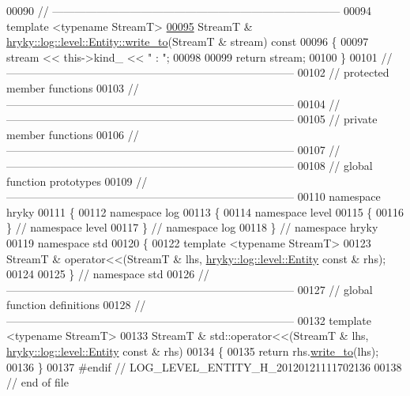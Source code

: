 \begin{DoxyCode}
00090 \textcolor{comment}{//
      ------------------------------------------------------------------------------}
00094 \textcolor{comment}{}\textcolor{keyword}{template} <\textcolor{keyword}{typename} StreamT>
\hypertarget{log__level__entity_8h_source_l00095}{}\hyperlink{classhryky_1_1log_1_1level_1_1_entity_aec2195adf72a8ac59a3bc065e1a6f1e9}{00095} StreamT & \hyperlink{classhryky_1_1log_1_1level_1_1_entity_aec2195adf72a8ac59a3bc065e1a6f1e9}{hryky::log::level::Entity::write_to}(StreamT & stream)\textcolor{keyword}{ const}
00096 \textcolor{keyword}{}\{
00097     stream << this->kind\_ << \textcolor{stringliteral}{" : "};
00098     
00099     \textcolor{keywordflow}{return} stream;
00100 \}
00101 \textcolor{comment}{//
      ------------------------------------------------------------------------------}
00102 \textcolor{comment}{// protected member functions}
00103 \textcolor{comment}{//
      ------------------------------------------------------------------------------}
00104 \textcolor{comment}{//
      ------------------------------------------------------------------------------}
00105 \textcolor{comment}{// private member functions}
00106 \textcolor{comment}{//
      ------------------------------------------------------------------------------}
00107 \textcolor{comment}{//
      ------------------------------------------------------------------------------}
00108 \textcolor{comment}{// global function prototypes}
00109 \textcolor{comment}{//
      ------------------------------------------------------------------------------}
00110 \textcolor{keyword}{namespace }hryky
00111 \{
00112 \textcolor{keyword}{namespace }log
00113 \{
00114 \textcolor{keyword}{namespace }level
00115 \{
00116 \} \textcolor{comment}{// namespace level}
00117 \} \textcolor{comment}{// namespace log}
00118 \} \textcolor{comment}{// namespace hryky}
00119 \textcolor{keyword}{namespace }std
00120 \{
00122     \textcolor{keyword}{template} <\textcolor{keyword}{typename} StreamT>
00123     StreamT & operator<<(StreamT & lhs, \hyperlink{classhryky_1_1log_1_1level_1_1_entity}{hryky::log::level::Entity} \textcolor{keyword}{const} & rhs);
00124 
00125 \} \textcolor{comment}{// namespace std}
00126 \textcolor{comment}{//
      ------------------------------------------------------------------------------}
00127 \textcolor{comment}{// global function definitions}
00128 \textcolor{comment}{//
      ------------------------------------------------------------------------------}
00132 \textcolor{comment}{}\textcolor{keyword}{template} <\textcolor{keyword}{typename} StreamT>
00133 StreamT & std::operator<<(StreamT & lhs, \hyperlink{classhryky_1_1log_1_1level_1_1_entity}{hryky::log::level::Entity} \textcolor{keyword}{const} & rhs)
00134 \{
00135     \textcolor{keywordflow}{return} rhs.\hyperlink{classhryky_1_1log_1_1level_1_1_entity_aec2195adf72a8ac59a3bc065e1a6f1e9}{write_to}(lhs);
00136 \}
00137 \textcolor{preprocessor}{#endif // LOG\_LEVEL\_ENTITY\_H\_20120121111702136}
00138 \textcolor{preprocessor}{}\textcolor{comment}{// end of file}
\end{DoxyCode}

